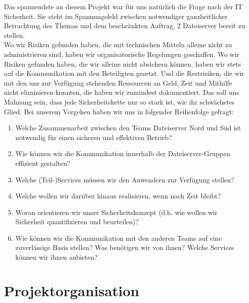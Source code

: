 Das spannendste an diesem Projekt war für uns natürlich die Frage nach der IT Sicherheit. Sie steht im Spannungsfeld zwischen notwendiger ganzheitlicher Betrachtung des Themas und dem beschränkten Auftrag, 2 Dateiserver bereit zu stellen.\\

Wo wir Risiken gefunden haben, die mit technischen Mitteln alleine nicht zu administrieren sind, haben wir organisatorische Regelungen geschaffen. Wo wir Risiken gefunden haben, die wir alleine nicht absichern können, haben wir stets auf die Kommunikation mit den Beteiligten gesetzt. Und die Restrisiken, die wir mit den uns zur Verfügung stehenden Ressourcen an Geld, Zeit und Mithilfe nicht eliminieren konnten, die haben wir zumindest dokumentiert. Das soll uns Mahnung sein, dass jede Sicherheitskette nur so stark ist, wie ihr schwächstes Glied.
Bei unserem Vorgehen haben wir uns in folgender Reihenfolge gefragt:

\begin{enumerate}
\item Welche Zusammenarbeit zwischen den Teams Dateiserver Nord und Süd ist \newline notwendig für einen sicheren und effektiven Betrieb? 
\item Wie können wir die Kommunikation innerhalb der Dateiserver-Gruppen effizient \newline gestalten?
\item Welche (Teil-)Services müssen wir den Anwendern zur Verfügung stellen?
\item Welche wollen wir darüber hinaus realisieren, wenn noch Zeit bleibt?
\item Woran orientieren wir unser Sicherheitskonzept 
(d.h. wie wollen wir Sicherheit \newline quantifizieren und beurteilen)?
\item Wie können wir die Kommunikation mit den anderen Teams auf eine zuverlässige Basis stellen? Was benötigen wir von ihnen? Welche Services können wir ihnen anbieten?
\end{enumerate}



\section{Projektorganisation}

